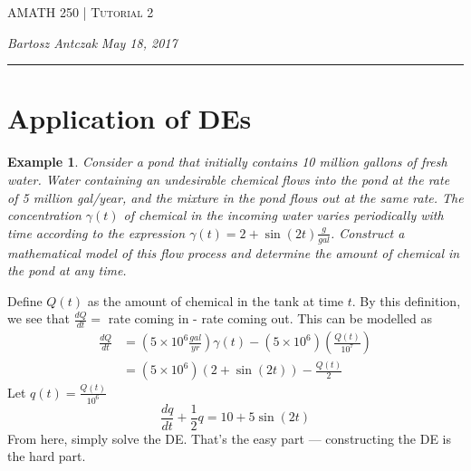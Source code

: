 \documentclass{report}
\newcommand{\lectureNum}{2}
\newcommand{\curDate}{May 18, 2017}
\newcommand{\course}{AMATH 250}
\newtheorem{ex}{Example}[section]
\begin{document}
\begin{center}
\begin{Large}
\textsc{\course{} | Tutorial \lectureNum{}}
\end{Large}
\end{center} 
\noindent \textit{Bartosz Antczak} \hfill
\textit{\curDate{}}
\rule{\textwidth}{0.4pt}
\section{Application of DEs}
\begin{ex}
Consider a pond that initially contains 10 million gallons of fresh water. Water containing an undesirable chemical flows into the pond at the rate of 5 million gal/year, and the mixture in the pond flows out at the same rate. The concentration $\gamma(t)$ of chemical in the incoming water varies periodically with time according to the expression $\gamma(t) = 2 + \sin (2t) \frac{g}{gal}$. Construct a mathematical model of this flow process and determine the amount of chemical in the pond at any time.
\end{ex}\noindent
Define $Q(t)$ as the amount of chemical in the tank at time $t$. By this definition, we see that $\frac{dQ}{dt} = $ rate coming in - rate coming out. This can be modelled as
\begin{align}
\frac{dQ}{dt} &= (5 \times 10^6 \frac{gal}{yr})\gamma(t) - (5 \times 10^6)\left(\frac{Q(t)}{10^7}\right) \\
&= (5 \times 10^6)(2 + \sin (2t)) - \frac{Q(t)}{2}
\end{align}
Let $q(t) = \frac{Q(t)}{10^6}$
$$\frac{dq}{dt} + \frac{1}{2}q = 10 + 5\sin (2t)$$
From here, simply solve the DE. That's the easy part --- constructing the DE is the hard part.
\end{document}
